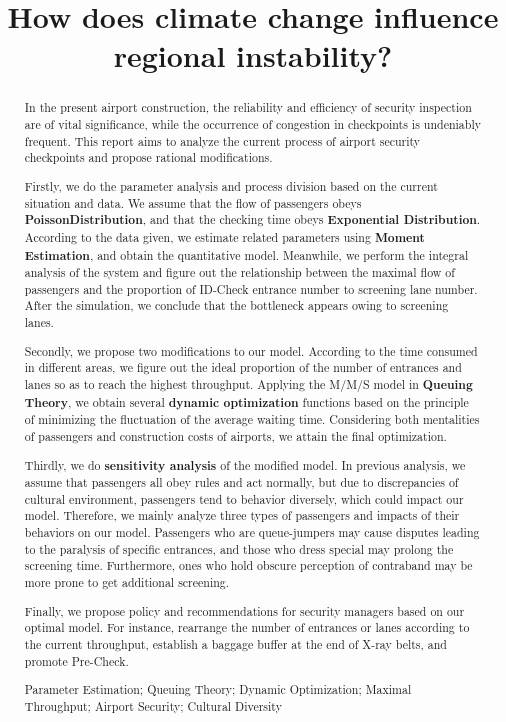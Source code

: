 \documentclass{mcmthesis}
\title{How does climate change influence regional instability?}
\author{}
\date{}
\begin{document}
\begin{abstract}
In the present airport construction, the reliability and efficiency of security inspection are of vital significance, while the occurrence of congestion in checkpoints is undeniably frequent. This report aims to analyze the current process of airport security checkpoints and propose rational modifications.

Firstly, we do the parameter analysis and process division based on the current situation and data. We assume that the flow of passengers obeys \textbf{PoissonDistribution}, and that the checking time obeys \textbf{Exponential Distribution}. According to the data given, we estimate related parameters using \textbf{Moment Estimation}, and obtain the quantitative model. Meanwhile, we perform the integral analysis of the system and figure out the relationship between the maximal flow of passengers and the proportion of ID-Check entrance number to screening lane number. After the simulation, we conclude that the bottleneck appears owing to screening lanes.

Secondly, we propose two modifications to our model. According to the time consumed in different areas, we figure out the ideal proportion of the number of entrances and lanes so as to reach the highest throughput. Applying the M/M/S model in \textbf{Queuing Theory}, we obtain several \textbf{dynamic optimization} functions based on the principle of minimizing the fluctuation of the average waiting time. Considering both mentalities of passengers and construction costs of airports, we attain the final optimization. 

Thirdly, we do \textbf{sensitivity analysis} of the modified model. In previous analysis, we assume that passengers all obey rules and act normally, but due to discrepancies of cultural environment, passengers tend to behavior diversely, which could impact our model. Therefore, we mainly analyze three types of passengers and impacts of their behaviors on our model. Passengers who are queue-jumpers may cause disputes leading to the paralysis of specific entrances, and those who dress special may prolong the screening time. Furthermore, ones who hold obscure perception of contraband may be more prone to get additional screening.

Finally, we propose policy and recommendations for security managers based on our optimal model. For instance, rearrange the number of entrances or lanes according to the current throughput, establish a baggage buffer at the end of X-ray belts, and promote Pre-Check.



\begin{keywords}
Parameter Estimation; Queuing Theory; Dynamic Optimization; Maximal Throughput; Airport Security; Cultural Diversity
\end{keywords}
\end{abstract}
\maketitle
\end{document}
